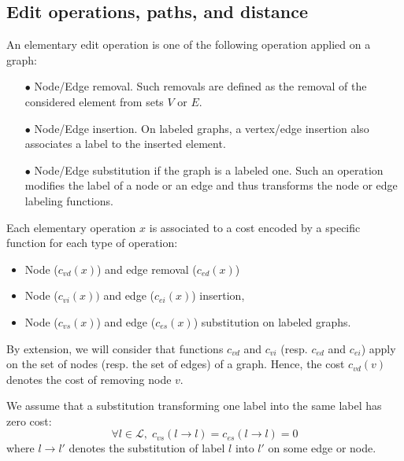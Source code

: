 \subsection{Edit operations, paths, and distance}\label{sec:mainDefEditDist}
\begin{definition}\label{def:elEditOp}  
  An elementary edit operation is one of the following operation
  applied on a graph:
  \begin{enumerate}
  \item[$\bullet$] Node/Edge removal. Such removals are defined as the
    removal of the considered element from sets $V$ or $E$.
  \item[$\bullet$] Node/Edge insertion. On labeled graphs, a vertex/edge
    insertion also associates a label to the inserted element.
  \item[$\bullet$] Node/Edge substitution if the graph is a labeled one.
    Such an operation modifies the label of a node or an edge and
    thus transforms the node or edge labeling functions.
  \end{enumerate}
\end{definition}
\begin{definition}\label{def:elEdOpCost}
  Each elementary operation $x$ is associated to a cost encoded by a
  specific function for each type of operation:
  \begin{itemize}
  \item Node ($c_{vd}(x)$) and edge removal ($c_{ed}(x)$)
  \item Node ($c_{vi}(x))$ and edge ($c_{ei}(x)$) insertion,
  \item Node ($c_{vs}(x)$) and edge ($c_{es}(x)$) substitution on labeled graphs.
  \end{itemize}
  By extension, we will consider that functions $c_{vd}$ and
  $c_{vi}$ (resp. $c_{ed}$ and $c_{ei}$) apply on the set of nodes
  (resp. the set of edges) of a graph. Hence, the cost $c_{vd}(v)$
  denotes the cost of removing node $v$.

  We assume that a substitution transforming one label into the same
  label has zero cost: 
  \[
  \forall l\in \mathcal{L}, \;c_{vs}(l\rightarrow l)=c_{es}(l\rightarrow l)=0
  \]
  where $l\rightarrow l'$ denotes the substitution of label $l$ into
  $l'$ on some edge or node.
\end{definition}
